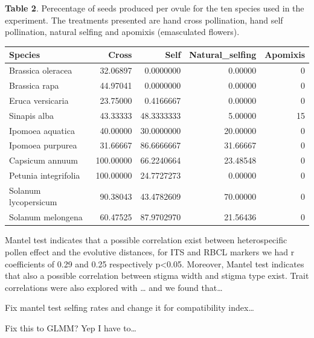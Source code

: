 \documentclass[11pt,a4paper]{article}
\begin{document}
\textbf{Table 2}. Perecentage of seeds produced per ovule for the ten
species used in the experiment. The treatments presented are hand cross
pollination, hand self pollination, natural selfing and apomixis
(emasculated flowers).

\begin{longtable}[]{@{}lrrrr@{}}
\toprule
Species & Cross & Self & Natural\_selfing & Apomixis\tabularnewline
\midrule
\endhead
Brassica oleracea & 32.06897 & 0.0000000 & 0.00000 & 0\tabularnewline
Brassica rapa & 44.97041 & 0.0000000 & 0.00000 & 0\tabularnewline
Eruca versicaria & 23.75000 & 0.4166667 & 0.00000 & 0\tabularnewline
Sinapis alba & 43.33333 & 48.3333333 & 5.00000 & 15\tabularnewline
Ipomoea aquatica & 40.00000 & 30.0000000 & 20.00000 & 0\tabularnewline
Ipomoea purpurea & 31.66667 & 86.6666667 & 31.66667 & 0\tabularnewline
Capsicum annuum & 100.00000 & 66.2240664 & 23.48548 & 0\tabularnewline
Petunia integrifolia & 100.00000 & 24.7727273 & 0.00000 &
0\tabularnewline
Solanum lycopersicum & 90.38043 & 43.4782609 & 70.00000 &
0\tabularnewline
Solanum melongena & 60.47525 & 87.9702970 & 21.56436 & 0\tabularnewline
\bottomrule
\end{longtable}

Mantel test indicates that a possible correlation exist between
heterospecific pollen effect and the evolutive distances, for ITS and
RBCL markers we had r coefficients of 0.29 and 0.25 respectively
p\textless{}0.05. Moreover, Mantel test indicates that also a possible
correlation between stigma width and stigma type exist. Trait
correlations were also explored with \ldots{} and we found that\ldots{}

Fix mantel test selfing rates and change it for compatibility
index\ldots{}

Fix this to GLMM? Yep I have to\ldots{}

\newpage
\end{document}
